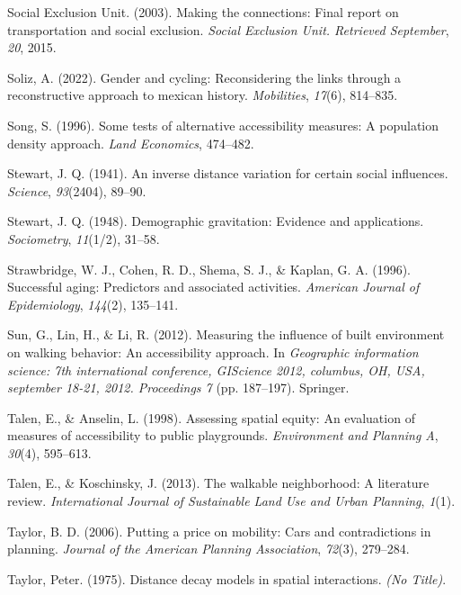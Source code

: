 \documentclass[
11pt, %
oneside, %
english, %
singlespacing, %
]{macthesis} %
\newlength{\cslhangindent}
\newenvironment{CSLReferences}[2] %
{\begin{list}{}{%
	\setlength{\itemindent}{0pt}
	\setlength{\leftmargin}{0pt}
	\setlength{\parsep}{0pt}
	\ifodd #1
	\setlength{\leftmargin}{\cslhangindent}
	\setlength{\itemindent}{-1\cslhangindent}
	\fi
	\setlength{\itemsep}{#2\baselineskip}}}
{\end{list}}
\begin{document}
\begin{CSLReferences}{1}{0}
Social Exclusion Unit. (2003). Making the connections: Final report on transportation and social exclusion. \emph{Social Exclusion Unit. Retrieved September}, \emph{20}, 2015.

Soliz, A. (2022). Gender and cycling: Reconsidering the links through a reconstructive approach to mexican history. \emph{Mobilities}, \emph{17}(6), 814--835.

Song, S. (1996). Some tests of alternative accessibility measures: A population density approach. \emph{Land Economics}, 474--482.

Stewart, J. Q. (1941). An inverse distance variation for certain social influences. \emph{Science}, \emph{93}(2404), 89--90.

Stewart, J. Q. (1948). Demographic gravitation: Evidence and applications. \emph{Sociometry}, \emph{11}(1/2), 31--58.

Strawbridge, W. J., Cohen, R. D., Shema, S. J., \& Kaplan, G. A. (1996). Successful aging: Predictors and associated activities. \emph{American Journal of Epidemiology}, \emph{144}(2), 135--141.

Sun, G., Lin, H., \& Li, R. (2012). Measuring the influence of built environment on walking behavior: An accessibility approach. In \emph{Geographic information science: 7th international conference, GIScience 2012, columbus, OH, USA, september 18-21, 2012. Proceedings 7} (pp. 187--197). Springer.

Talen, E., \& Anselin, L. (1998). Assessing spatial equity: An evaluation of measures of accessibility to public playgrounds. \emph{Environment and Planning A}, \emph{30}(4), 595--613.

Talen, E., \& Koschinsky, J. (2013). The walkable neighborhood: A literature review. \emph{International Journal of Sustainable Land Use and Urban Planning}, \emph{1}(1).

Taylor, B. D. (2006). Putting a price on mobility: Cars and contradictions in planning. \emph{Journal of the American Planning Association}, \emph{72}(3), 279--284.

Taylor, Peter. (1975). Distance decay models in spatial interactions. \emph{(No Title)}.


\end{CSLReferences}
\end{document}
